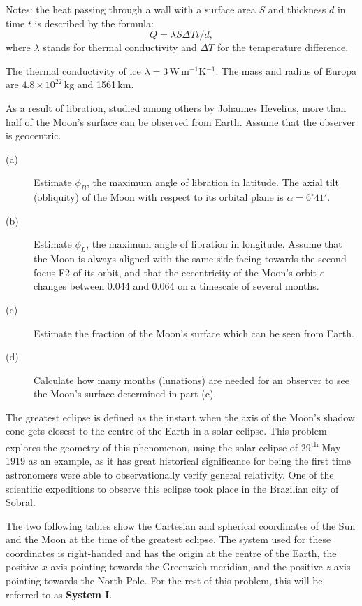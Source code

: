 Notes: the heat passing through a wall with a surface area $S$ and thickness
$d$ in time $t$ is described by the formula:
\[ Q = \lambda S \Delta T t / d, \]
where $\lambda$ stands for thermal conductivity and $\Delta T$ for the
temperature difference.

The thermal conductivity of ice
$\lambda = 3$\,W\,m$^{-1}$K$^{-1}$. The mass and radius of Europa are
$4.8 \times 10^{22}$\,kg and 1561\,km.

As a result of libration, studied among others by Johannes Hevelius, more
than half of the Moon's surface can be observed from Earth. Assume that the
observer is geocentric.

\begin{description}
\item[(a)] Estimate $\phi_B$, the maximum angle of libration in latitude. The
  axial tilt (obliquity) of the Moon with respect to its orbital plane is
  $\alpha = 6^\circ 41'$.
\item[(b)] Estimate $\phi_L$, the maximum angle of libration in longitude.
  Assume that the Moon is always aligned with the same side facing towards
  the second focus F2 of its orbit, and that the eccentricity of the Moon's
  orbit $e$ changes between 0.044 and 0.064 on a timescale of several months.
\item[(c)] Estimate the fraction of the Moon's surface which can be seen from
  Earth.
\item[(d)] Calculate how many months (lunations) are needed for an observer
  to see the Moon's surface determined in part (c).
\end{description}

The greatest eclipse is defined as the instant when the axis of the Moon's
shadow cone gets closest to the centre of the Earth in a solar eclipse. This
problem explores the geometry of this phenomenon, using the solar eclipse of
29\textsuperscript{th} May 1919 as an example, as it has great historical
significance for being the first time astronomers were able to
observationally verify general relativity. One of the scientific expeditions
to observe this eclipse took place in the Brazilian city of Sobral.

The two following tables show the Cartesian and spherical coordinates of the
Sun and the Moon at the time of the greatest eclipse. The system used for
these coordinates is right-handed and has the origin at the centre of the
Earth, the positive $x$-axis pointing towards the Greenwich meridian, and the
positive $z$-axis pointing towards the North Pole. For the rest of this
problem, this will be referred to as \textbf{System I}.

